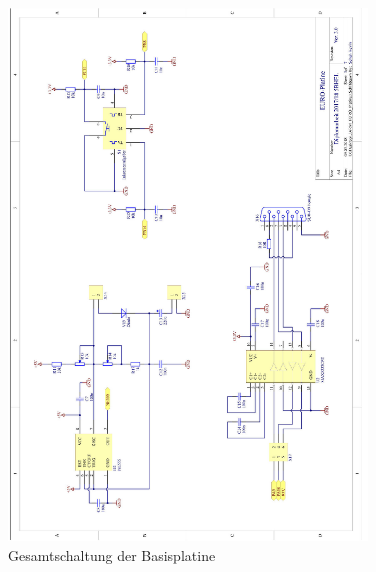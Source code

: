 \begin{figure}[H]\ContinuedFloat
    \centering
    \includegraphics[width=0.85\textwidth]{Schuh/Pictures/Basis-Schaltung3}
    \caption[Gesamtschaltung der Basisplatine]{Gesamtschaltung der \gls{Basisplatine}}
\end{figure}
